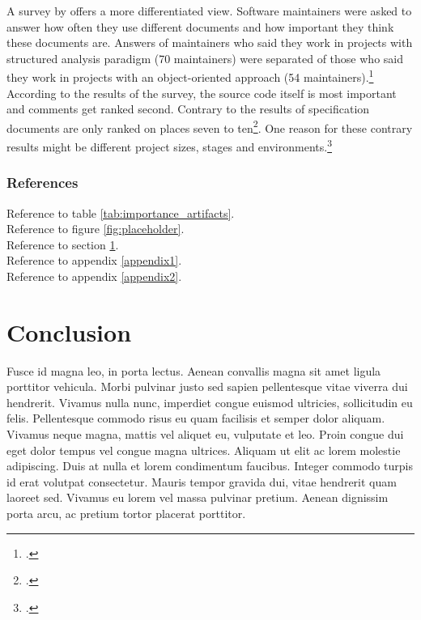A survey by \citeauthor{de_souza_study_2005} offers a more differentiated view.
Software maintainers were asked to answer how often they use different documents
and how important they think these documents are. Answers of maintainers who
said they work in projects with structured analysis paradigm (70 maintainers)
were separated of those who said they work in projects with an object-oriented
approach (54 maintainers).\footcite[Cf.][69-74]{de_souza_study_2005}
According to the results of the survey, the source code itself is most important
and comments get ranked second. Contrary to the results of \citeauthor{forward_relevance_2002}
specification documents are only ranked on places seven to
ten\footcite[Cf.][98]{huang_towards_2003}. One reason for these contrary results
might be different project sizes, stages and
environments.\footcite[Cf.][233]{huang_towards_2003}%

\subsubsection{References}

Reference to table \ref{tab:importance_artifacts}.\\
Reference to figure \ref{fig:placeholder}.\\
Reference to section \ref{sec:conclusion}.\\
Reference to appendix \ref{appendix1}.\\
Reference to appendix \ref{appendix2}.\\


\newpage


\section{Conclusion}
\label{sec:conclusion}

Fusce id magna leo, in porta lectus. Aenean convallis magna sit amet ligula
porttitor vehicula. Morbi pulvinar justo sed sapien pellentesque vitae viverra
dui hendrerit. Vivamus nulla nunc, imperdiet congue euismod ultricies,
sollicitudin eu felis. Pellentesque commodo risus eu quam facilisis et semper
dolor aliquam. Vivamus neque magna, mattis vel aliquet eu, vulputate et leo.
Proin congue dui eget dolor tempus vel congue magna ultrices. Aliquam ut elit
ac lorem molestie adipiscing. Duis at nulla et lorem condimentum faucibus.
Integer commodo turpis id erat volutpat consectetur. Mauris tempor gravida
dui, vitae hendrerit quam laoreet sed. Vivamus eu lorem vel massa pulvinar
pretium. Aenean dignissim porta arcu, ac pretium tortor placerat porttitor. 







